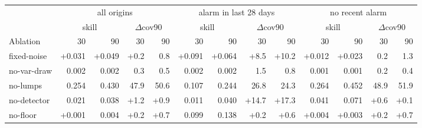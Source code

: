 \begin{tabular}{l rrrr rrrr rrrr}
\toprule
 & \multicolumn{4}{c}{all origins} & \multicolumn{4}{c}{alarm in last 28 days} & \multicolumn{4}{c}{no recent alarm}\\
\cmidrule(lr){2-5}\cmidrule(lr){6-9}\cmidrule(lr){10-13}
 & \multicolumn{2}{c}{skill} & \multicolumn{2}{c}{$\Delta$cov90} & \multicolumn{2}{c}{skill} & \multicolumn{2}{c}{$\Delta$cov90} & \multicolumn{2}{c}{skill} & \multicolumn{2}{c}{$\Delta$cov90}\\
Ablation & 30 & 90 & 30 & 90 & 30 & 90 & 30 & 90 & 30 & 90 & 30 & 90\\
\midrule
fixed-noise & +0.031 & +0.049 & +0.2 & \textminus{}0.8 & +0.091 & +0.064 & +8.5 & +10.2 & +0.012 & +0.023 & \textminus{}0.2 & \textminus{}1.3 \\
no-var-draw & \textminus{}0.002 & \textminus{}0.002 & \textminus{}0.3 & \textminus{}0.5 & \textminus{}0.002 & \textminus{}0.002 & \textminus{}1.5 & \textminus{}0.8 & \textminus{}0.001 & \textminus{}0.001 & \textminus{}0.2 & \textminus{}0.4 \\
no-lumps & \textminus{}0.254 & \textminus{}0.430 & \textminus{}47.9 & \textminus{}50.6 & \textminus{}0.107 & \textminus{}0.244 & \textminus{}26.8 & \textminus{}24.3 & \textminus{}0.264 & \textminus{}0.452 & \textminus{}48.9 & \textminus{}51.9 \\
no-detector & \textminus{}0.021 & \textminus{}0.038 & +1.2 & +0.9 & \textminus{}0.011 & \textminus{}0.040 & +14.7 & +17.3 & \textminus{}0.041 & \textminus{}0.071 & +0.6 & +0.1 \\
no-floor & +0.001 & \textminus{}0.004 & +0.2 & +0.7 & \textminus{}0.099 & \textminus{}0.138 & +0.2 & +0.6 & +0.004 & +0.003 & +0.2 & +0.7 \\
\bottomrule
\end{tabular}
